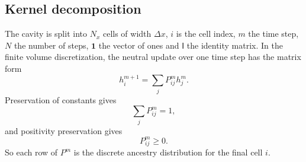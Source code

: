 \documentclass[11pt,a4paper]{report}
\newcommand{\one}{\mathbf 1}
\newcommand{\Id}{\mathsf I}
\begin{document}
	\subsection{Kernel decomposition}
	The cavity is split into $N_x$ cells of width $\Delta x$, $i$ is the cell index, $m$ the time step, $N$ the number of steps, $\one$ the vector of ones and $\Id$ the identity matrix. In the finite volume discretization, the neutral update over one time step has
	the matrix form
	\begin{equation}
		h_i^{m+1}=\sum_j P_{ij}^{m} h_j^{m}.
		\label{eq:discrete-neutral-update}
	\end{equation}
	Preservation of constants gives
	\begin{equation}
		\sum_j P_{ij}^{m}=1,
		\label{eq:discrete-row-sum}
	\end{equation}
	and positivity preservation gives
	\begin{equation}
		P_{ij}^{m}\ge 0 .
		\label{eq:discrete-positivity}
	\end{equation}
	So each row of \(P^m\) is the discrete ancestry distribution for the final
	cell \(i\).
\end{document}
